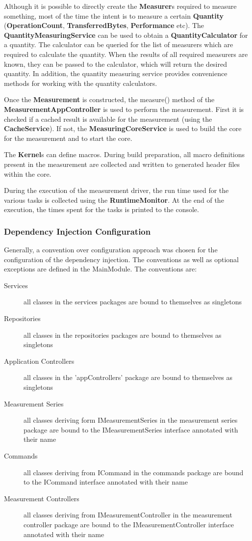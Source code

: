 \documentclass[a4paper,12pt]{article}
\newcommand{\class}[1]{\textbf{#1}}
\newcommand{\method}[1]{\textsf{#1}}
\begin{document}
Although it is possible to directly create the \class{Measurer}s required to
measure something, most of the time the intent is to measure a certain
\class{Quantity} (\class{OperationCount}, \class{TransferredBytes},
\class{Performance} etc). The \class{QuantityMeasuringService} can be used to
obtain a \class{QuantityCalculator} for a quantity. The calculator can be
queried for the list of measurers which are required to calculate the quantity.
When the results of all required measurers are known, they can be passed to the
calculator, which will return the desired quantity. In addition, the quantity
measuring service provides convenience methods for working with the quantity
calculators.

Once the \class{Measurement} is constructed, the \method{measure()} method of
the  \class{MeasurementAppController} is used to perform the measurement. First
it is checked if a cached result is available for the measurement (using the
\class{CacheService}). If not, the \class{MeasuringCoreService} is used to build
the core for the measurement and to start the core.

The \class{Kernel}s can define macros. During build preparation, all macro
definitions present in the measurement are collected and written to generated
header files within the core.

During the execution of the measurement driver, the run time used for the
various tasks is collected using the \class{RuntimeMonitor}. At the end of the
execution, the times spent for the tasks is printed to the console.


\subsubsection{Dependency Injection Configuration}
Generally, a convention over configuration approach was chosen for the
configuration of the dependency injection. The conventions as well as optional
exceptions are defined in the MainModule. 
The conventions are:
\begin{description}
\item[Services] all classes in the services packages are bound to themselves as
singletons
\item[Repositories] all classes in the repositories packages are bound to
themselves as singletons
\item[Application Controllers] all classes in the 'appControllers' package are
bound to themselves as singletons
\item[Measurement Series] all classes deriving form IMeasurementSeries in the
measurement series package are bound to the IMeasurementSeries interface
annotated with their name
\item[Commands] all classes deriving from ICommand in the commands package are
bound to the ICommand interface annotated with their name
\item[Measurement Controllers] all classes deriving from IMeasurementController
in the measurement controller package are bound to the IMeasurementController
interface annotated with their name
\end{description}
\end{document}
